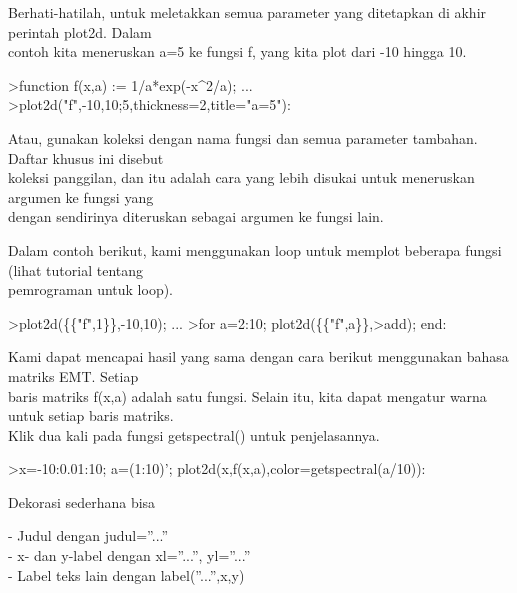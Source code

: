 \documentclass[a4paper,10pt]{article}
\begin{document}
\begin{eulernotebook}
\begin{eulercomment}
\begin{eulercomment}
\begin{eulercomment}
\begin{eulercomment}
\begin{eulercomment}
\begin{eulercomment}
\begin{eulercomment}
Berhati-hatilah, untuk meletakkan semua parameter yang ditetapkan di
akhir perintah plot2d. Dalam\\
contoh kita meneruskan a=5 ke fungsi f, yang kita plot dari -10 hingga
10.
\end{eulercomment}
\begin{eulerprompt}
>function f(x,a) := 1/a*exp(-x^2/a); ...
>plot2d("f",-10,10;5,thickness=2,title="a=5"):
\end{eulerprompt}
\begin{eulercomment}
Atau, gunakan koleksi dengan nama fungsi dan semua parameter tambahan.
Daftar khusus ini disebut\\
koleksi panggilan, dan itu adalah cara yang lebih disukai untuk
meneruskan argumen ke fungsi yang\\
dengan sendirinya diteruskan sebagai argumen ke fungsi lain.

Dalam contoh berikut, kami menggunakan loop untuk memplot beberapa
fungsi (lihat tutorial tentang\\
pemrograman untuk loop).
\end{eulercomment}
\begin{eulerprompt}
>plot2d(\{\{"f",1\}\},-10,10); ...
>for a=2:10; plot2d(\{\{"f",a\}\},>add); end:
\end{eulerprompt}
\begin{eulercomment}
Kami dapat mencapai hasil yang sama dengan cara berikut menggunakan
bahasa matriks EMT. Setiap\\
baris matriks f(x,a) adalah satu fungsi. Selain itu, kita dapat
mengatur warna untuk setiap baris matriks.\\
Klik dua kali pada fungsi getspectral() untuk penjelasannya.
\end{eulercomment}
\begin{eulerprompt}
>x=-10:0.01:10; a=(1:10)'; plot2d(x,f(x,a),color=getspectral(a/10)):
\end{eulerprompt}
\begin{eulercomment}
Dekorasi sederhana bisa

- Judul dengan judul=”...”\\
- x- dan y-label dengan xl=”...”, yl=”...”\\
- Label teks lain dengan label(”...”,x,y)


\end{eulercomment}
\end{eulercomment}
\end{eulercomment}
\end{eulercomment}
\end{eulercomment}
\end{eulercomment}
\end{eulercomment}
\end{eulernotebook}
\end{document}
